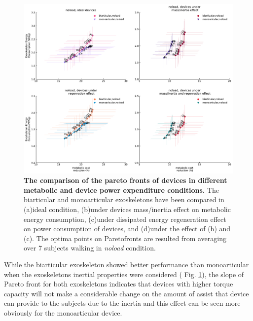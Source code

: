\documentclass[10pt,letterpaper]{article}
\begin{document}
\begin{figure}[ht]   
	\centering
	\includegraphics[width=\linewidth]{Pareto_Mass_Regenration_Figures/PaperFigure_AddingMass_Pareto.pdf}
	\vspace{1mm}
	\caption{{\small\textbf{The comparison of the pareto fronts of devices in different metabolic and device power expenditure conditions.} The biarticular and monoarticular exoskeletons have been compared in (a)ideal condition, (b)under devices mass/inertia effect on metabolic energy consumption, (c)under dissipated energy regeneration effect on power consumption of devices, and (d)under the effect of (b) and (c). The optima points on Paretofronts are resulted from averaging over 7 subjects walking in {\it noload} condition.}}
	\label{Fig_Paretofronts_Mass_Regeneration_Effect}
\end{figure}
While the biarticular exoskeleton showed better performance than monoarticular when the exoskeletons inertial properties were considered ( Fig. \ref{Fig_Paretofronts_Mass_Regeneration_Effect}), the slope of Pareto front for both exoskeletons indicates that devices with higher torque capacity will not make a considerable change on the amount of assist that device can provide to the subjects due to the inertia and this effect can be seen more obviously for the monoarticular device.\\
\end{document}
